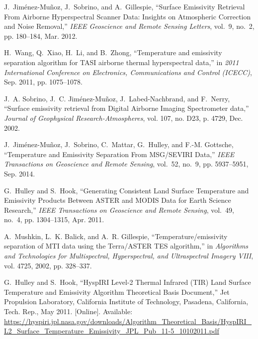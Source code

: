 \begin{thebibliography}{10}
J.~Jim\'{e}nez-Mu\~{n}oz, J.~Sobrino, and A.~Gillespie, ``Surface {Emissivity}
  {Retrieval} {From} {Airborne} {Hyperspectral} {Scanner} {Data}: {Insights} on
  {Atmospheric} {Correction} and {Noise} {Removal},'' \emph{IEEE Geoscience and
  Remote Sensing Letters}, vol.~9, no.~2, pp. 180--184, Mar. 2012.

H.~Wang, Q.~Xiao, H.~Li, and B.~Zhong, ``Temperature and emissivity separation
  algorithm for {TASI} airborne thermal hyperspectral data,'' in \emph{2011
  {International} {Conference} on {Electronics}, {Communications} and {Control}
  ({ICECC})}, Sep. 2011, pp. 1075--1078.

J.~A. Sobrino, J.~C. Jim\'{e}nez-Mu\~{n}oz, J.~Labed-Nachbrand, and F.~Nerry,
  ``Surface emissivity retrieval from {Digital}
  {Airborne} {Imaging} {Spectrometer} data,''
  \emph{Journal of Geophysical
  Research-Atmospheres}, vol. 107, no. D23, p. 4729, Dec. 2002.

J.~Jim\'{e}nez-Mu\~{n}oz, J.~Sobrino, C.~Mattar, G.~Hulley, and F.-M. Gottsche,
  ``Temperature and {Emissivity} {Separation} {From} {MSG}/{SEVIRI} {Data},''
  \emph{IEEE Transactions on Geoscience and Remote Sensing}, vol.~52, no.~9,
  pp. 5937--5951, Sep. 2014.

G.~Hulley and S.~Hook, ``Generating {Consistent} {Land} {Surface} {Temperature}
  and {Emissivity} {Products} {Between} {ASTER} and {MODIS} {Data} for {Earth}
  {Science} {Research},'' \emph{IEEE Transactions on Geoscience and Remote
  Sensing}, vol.~49, no.~4, pp. 1304--1315, Apr. 2011.

A.~Mushkin, L.~K. Balick, and A.~R. Gillespie, ``Temperature/emissivity
  separation of {MTI} data using the {Terra}/{ASTER} {TES} algorithm,'' in
  \emph{Algorithms and Technologies for Multispectral, Hyperspectral, and
  Ultraspectral Imagery VIII}, vol. 4725, 2002, pp. 328--337.

G.~Hulley and S.~Hook, ``{HyspIRI} {Level}-2 {Thermal} {Infrared} ({TIR})
  {Land} {Surface} {Temperature} and {Emissivity} {Algorithm} {Theoretical}
  {Basis} {Document},'' Jet Propulsion Laboratory, California Institute of
  Technology, Pasadena, California, Tech. Rep., May 2011. [Online]. Available:
  \url{https://hyspiri.jpl.nasa.gov/downloads/Algorithm_Theoretical_Basis/HyspIRI_L2_Surface_Temperature_Emissivity_JPL_Pub_11-5_10102011.pdf}


\end{thebibliography}
